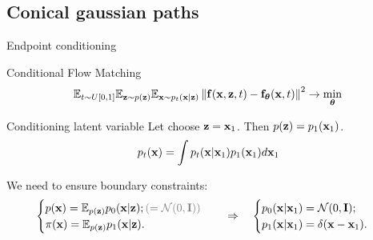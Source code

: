 \subsection{Conical gaussian paths}
\begin{frame}{Endpoint conditioning}
	\begin{block}{Conditional Flow Matching}
		\vspace{-0.3cm}
		\[
			\mathbb{E}_{t \sim U[0, 1]} \mathbb{E}_{\mathbf{z} \sim p(\mathbf{z})} \mathbb{E}_{\mathbf{x} \sim p_t(\mathbf{x} | \mathbf{z})}\left\| \mathbf{f}(\mathbf{x}, \mathbf{z}, t) - \mathbf{f}_{\boldsymbol{\theta}}(\mathbf{x}, t) \right\|^2 \rightarrow \min_{\boldsymbol{\theta}}
		\]
		\vspace{-0.3cm}
	\end{block}
	\begin{block}{Conditioning latent variable}
		Let choose $\mathbf{z} = \mathbf{x}_1$. Then $p(\mathbf{z}) = p_1(\mathbf{x}_1)$.
		\[
			p_t(\mathbf{x}) = \int p_t(\mathbf{x} | \mathbf{x}_1) p_1(\mathbf{x}_1) d \mathbf{x}_1
		\]
	\end{block}
	We need to ensure boundary constraints:
	\[
		\begin{cases}
			p(\bx) = \bbE_{p(\bz)} p_0(\bx | \bz); {\color{gray}(= \cN(0, \bI))} \\
			\pi(\bx) = \bbE_{p(\bz)} p_1(\bx | \bz).
		\end{cases}
		\quad \Rightarrow \quad 
		\begin{cases}
			p_0(\bx | \bx_1) = \cN(0, \bI); \\
			p_1(\bx | \bx_1) = \delta(\bx - \bx_1).
		\end{cases}
	\]
	\vspace{-0.3cm}
\end{frame}
